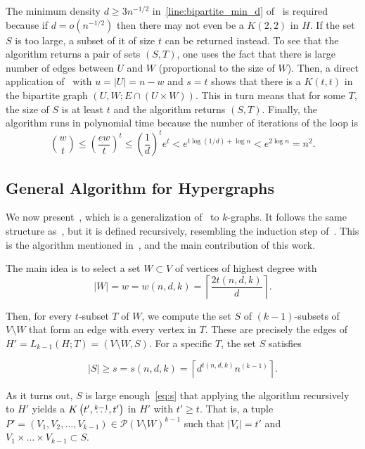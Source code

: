 The minimum density $d \geq 3n^{-1/2}$ in~\cref{line:bipartite_min_d} of~ is required
because if $d = o\left(n^{-1/2}\right)$ then
there may not even be a $K(2, 2)$ in $H$.
If the set $S$ is too large, a subset of it of size $t$ can be returned instead.
To see that the algorithm returns a pair of sets $(S, T)$, one uses the fact that
there is large number of edges between $U$ and $W$ (proportional to the size of $W$).
Then, a direct application of~
with $u = |U| = n - w$ and $s = t$ shows that
there is a $K(t, t)$ in the bipartite graph $(U, W; E \cap (U \times W))$.
This in turn means that for some $T$,
the size of $S$ is at least $t$
and the algorithm returns $(S, T)$.
Finally, the algorithm runs in polynomial time because 
the  number of iterations of the loop is
\[
    \binom{w}{t} \leq
    \left(\frac{ew}{t}\right)^t \leq
    \left(\frac{1}{d}\right)^t e^t < e^{t \log (1/d) + \log n} <
    e^{2\log n} = n^2.
\]

\subsection{General Algorithm for Hypergraphs} \label{subsec:algorithm-for-k-graphs}

We now present~, which is
a generalization of~ to $k$-graphs.
It follows the same structure as~,
but it is defined recursively, resembling the induction step of~.
This is the algorithm mentioned in~,
and the main contribution of this work.

The main idea is to select a set $W \subset V$ of vertices of highest degree with
\begin{equation}
    \label{eq:w}
    |W| = w = w(n, d, k) = \left\lceil \frac{2t(n, d, k)}{d} \right\rceil.
\end{equation}

Then, for every $t$-subset $T$ of $W$, we compute the set $S$ of $(k-1)$-subsets of $V \setminus W$
that form an edge with every vertex in $T$.
These are precisely the edges of $H' = L_{k-1}(H; T) = (V \setminus W, S)$.
For a specific $T$, the set $S$ satisfies

\begin{equation}
    \label{eq:s}
    |S| \geq s = s(n, d, k) = \left\lceil d^{t(n, d, k)} n^{(k-1)} \right\rceil.
\end{equation}

As it turns out, $S$ is large enough~\eqref{eq:s}
that applying the algorithm recursively to $H'$
yields a $K\left(t', \overset{k-1}{\dots}, t'\right)$ in $H'$ with $t' \geq t$.
That is, a tuple
$P' = (V_1, V_2, \dots, V_{k-1}) \in \mathcal{P}(V \setminus W)^{k-1}$ such that $|V_i| = t'$ and
$V_1 \times \dots \times V_{k-1}\subset S$.

